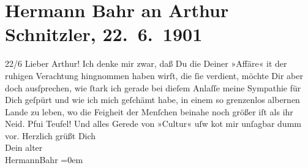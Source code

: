 

         \renewcommand{\erwaehnteOrte}{Orte: Wien}
         \renewcommand{\erwaehnteWerke}{}
               \section[Hermann Bahr an Arthur Schnitzler, 22. 6. 1901]{ Hermann Bahr an Arthur Schnitzler, 22. 6. 1901}\nopagebreak{}\rehead{ }\begin{ledgroupsized}[t]{13cm}\normalsize\beginnumbering \toendnotes[C]{\smallbreak\pagebreak[2]} 
\toendnotes[C]{\smallbreak}\pstart
           \raggedleft{}{\pb}22/6\pend
           \pstart\center{}Lieber Arthur!\pend\pstart
           Ich denke mir zwar, daß Du die \label{K_L01131-1v}\label{K_L01131-1h} Deiner »Affäre« it der ruhigen Verachtung hingnommen haben wirſt, die ſie verdient, möchte Dir aber doch ausſprechen, wie
               ſtark ich gerade bei dieſem Anlaſſe meine Sympathie für {\pb}Dich geſpürt und wie ich mich geſchämt habe, in
               einem so grenzenlos albernen Lande zu leben, wo die Feigheit der Menſchen beinahe
               noch größer iſt als ihr Neid. Pfui Teufel! Und alles Gerede von »Cultur« uſw ko{\geminationm}t mir unſagbar dumm vor.\pend
           \pstart
           Herzlich grüßt Dich{\\[\baselineskip]}Dein alter{\\[\baselineskip]}\spacefill\mbox{HermannBahr}\pend
           \leftskip=0em{}
         
         \endnumbering{}\end{ledgroupsized}  \newcommand{\dateiname}{L01131}\newcommand{\titel}{Hermann Bahr an Arthur Schnitzler, 22. 6. 1901}\newcommand{\editorInnen}{ Kurt Ifkovits,  Martin Anton Müller}
      